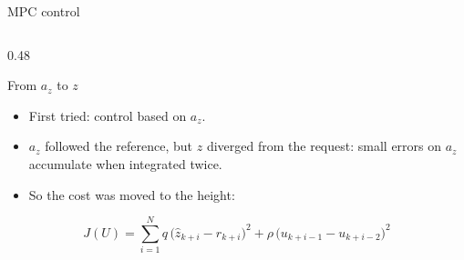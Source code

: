 \begin{frame}{MPC control}
\begin{columns}[T,onlytextwidth]
        \begin{column}{0.48\textwidth}
            \begin{alertblock}{From $a_z$ to $z$}
                \scriptsize
                \begin{itemize}\setlength{\itemsep}{0pt}
                    \item First tried: control based on $a_z$.
                    \item $a_z$ followed the reference, but $z$ diverged
                    from the request: small errors on $a_z$ accumulate
                    when integrated twice.
                    \item So the cost was moved to the height:
                \end{itemize}
                \setlength{\abovedisplayskip}{2pt}\setlength{\belowdisplayskip}{0pt}
                \[
                    J(U) = \sum_{i=1}^{N} q\,\big(\hat{z}_{k+i} - r_{k+i}\big)^2
                    + \rho\,\big(u_{k+i-1} - u_{k+i-2}\big)^2
                \]
            \end{alertblock}
        \end{column}
    \end{columns}
\end{frame}
